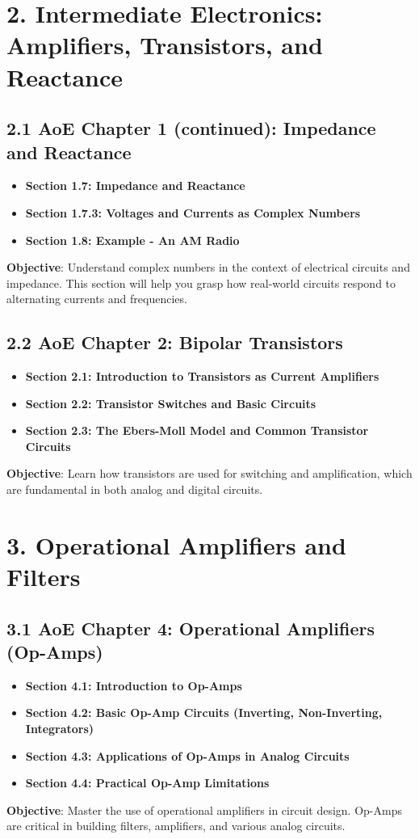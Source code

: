 \documentclass{article}
\begin{document}
\section*{2. Intermediate Electronics: Amplifiers, Transistors, and Reactance}

\subsection*{2.1 AoE Chapter 1 (continued): Impedance and Reactance}
\begin{itemize}
    \item \textbf{Section 1.7: Impedance and Reactance}
    \item \textbf{Section 1.7.3: Voltages and Currents as Complex Numbers}
    \item \textbf{Section 1.8: Example - An AM Radio}
\end{itemize}
\textbf{Objective}: Understand complex numbers in the context of electrical circuits and impedance. This section will help you grasp how real-world circuits respond to alternating currents and frequencies.

\subsection*{2.2 AoE Chapter 2: Bipolar Transistors}
\begin{itemize}
    \item \textbf{Section 2.1: Introduction to Transistors as Current Amplifiers}
    \item \textbf{Section 2.2: Transistor Switches and Basic Circuits}
    \item \textbf{Section 2.3: The Ebers-Moll Model and Common Transistor Circuits}
\end{itemize}
\textbf{Objective}: Learn how transistors are used for switching and amplification, which are fundamental in both analog and digital circuits.

\section*{3. Operational Amplifiers and Filters}

\subsection*{3.1 AoE Chapter 4: Operational Amplifiers (Op-Amps)}
\begin{itemize}
    \item \textbf{Section 4.1: Introduction to Op-Amps}
    \item \textbf{Section 4.2: Basic Op-Amp Circuits (Inverting, Non-Inverting, Integrators)}
    \item \textbf{Section 4.3: Applications of Op-Amps in Analog Circuits}
    \item \textbf{Section 4.4: Practical Op-Amp Limitations}
\end{itemize}
\textbf{Objective}: Master the use of operational amplifiers in circuit design. Op-Amps are critical in building filters, amplifiers, and various analog circuits.
\end{document}
